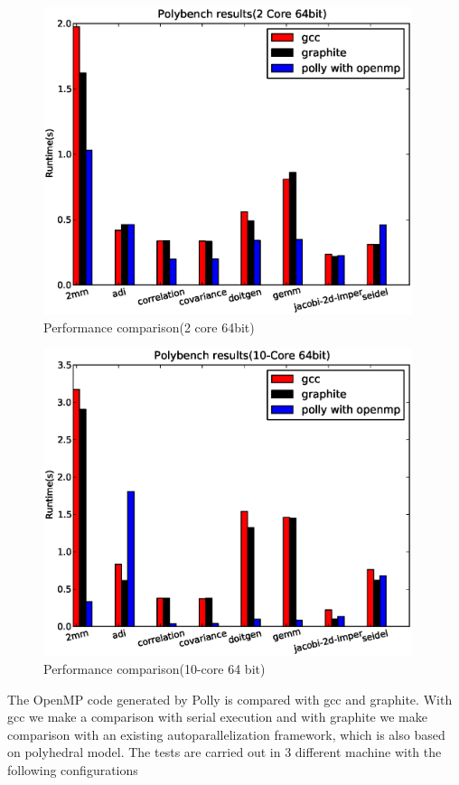\begin{figure}
\begin{center}
  \includegraphics[height=9cm]{images/2core64bit.eps}
  \caption{Performance comparison(2 core 64bit)}
  \label{fig:2core2}
\end{center}
\end{figure}

\begin{figure}
\begin{center}
  \includegraphics[height=9cm]{images/10core64bit.eps}
  \caption{Performance comparison(10-core 64 bit)}
  \label{fig:10core}
\end{center}
\end{figure}

The OpenMP code generated by Polly is compared with gcc and graphite\cite{TRIFUNOVIC:2010}. With gcc
we make a comparison with serial execution and with graphite we make comparison
with an existing autoparallelization framework, which is also based on polyhedral
model. 
The tests are carried out in 3 different machine with the following configurations

